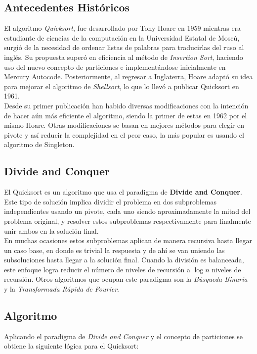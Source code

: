 \documentclass[conference]{IEEEtran}
\begin{document}
\subsection{Antecedentes Históricos}
El algoritmo \textit{Quicksort}, fue desarrollado por Tony Hoare en 1959 mientras era estudiante de ciencias de la computación en la Universidad Estatal de Moscú, 
surgió de la necesidad de ordenar listas de palabras para traducirlas del ruso al inglés. 
Su propuesta superó en eficiencia al método de \textit{Insertion Sort}, haciendo uso del nuevo concepto de particiones e implementándose inicialmente en Mercury Autocode. 
Posteriormente, al regresar a Inglaterra, Hoare adaptó su idea para mejorar el algoritmo de \textit{Shellsort}, lo que lo llevó a publicar Quicksort en 1961.\cite{original_paper}
\\
Desde su primer publicación han habido diversas modificaciones con la intención de hacer aún más eficiente el algoritmo, siendo la primer de estas en 1962 por el mismo Hoare.
Otras modificaciones se basan en mejores métodos para elegir en pivote y así reducir la complejidad en el peor caso, la más popular es usando el algoritmo de Singleton.
\cite{history} 

\subsection{Divide and Conquer}
El Quicksort es un algoritmo que usa el paradigma de \textbf{Divide and Conquer}. 
Este tipo de solución implica dividir el problema en dos subproblemas independientes usando un pivote, 
cada uno siendo aproximadamente la mitad del problema original, y resolver estos subproblemas respectivamente para finalmente unir ambos en la solución final.\\
En muchas ocasiones estos subproblemas aplican de manera recursiva hasta llegar un caso base, en donde es trivial la respuesta y de ahí se van uniendo las subsoluciones hasta llegar a la solución final.
Cuando la división es balanceada, este enfoque logra reducir el número de niveles de recursión a $\log{n}$ niveles de recursión.
Otros algoritmos que ocupan este paradigma son la \textit{Búsqueda Binaria} y la \textit{Transformada Rápida de Fourier}.
\cite{divide_and_conquer}


\subsection{Algoritmo}
Aplicando el paradigma de \textit{Divide and Conquer} y el concepto de particiones se obtiene la siguiente lógica para el Quicksort:
\end{document}
